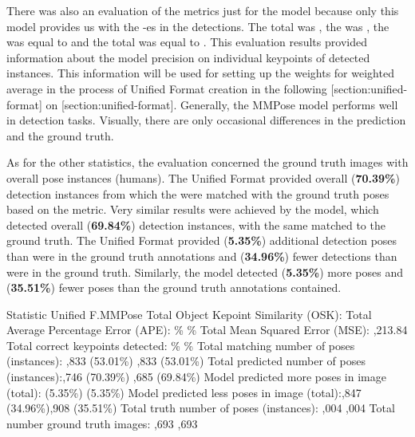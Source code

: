 
There was also an evaluation of the metrics just for the  model because only this model provides us with the \BBOX\--es in the detections. The total \pojem{\OKS} was , the \pojem{\APE} was , the \pojem{\MSE} was equal to  and the total  was equal to . This evaluation results provided information about the model precision on individual keypoints of detected instances. This information will be used for setting up the weights for weighted average in the process of Unified Format creation in the following [section:unified-format] on [section:unified-format]. Generally, the MMPose model performs well in detection tasks. Visually, there are only occasional differences in the prediction and the ground truth.

As for the other statistics, the evaluation concerned the  ground truth images with overall  pose instances (humans). The Unified Format provid\-ed overall  ({\bf 70.39\%}) detection instances from which the  were match\-ed with the ground truth poses based on the \pojem{\IoU} metric. Very similar results were achieved by the  model, which detected overall  ({\bf 69.84\%}) detection instances, with the same  matched to the ground truth. The Unified Format provided  ({\bf 5.35\%}) additional detection poses than were in the ground truth annotations and  ({\bf 34.96\%}) fewer detections than were in the ground truth. Similarly, the  model detected  ({\bf 5.35\%}) more poses and  ({\bf 35.51\%}) fewer poses than the ground truth annotations contained.

 \setupTABLE[r][1][style=bold]
 \setupTABLE[c][each][offset=3dd]
 \setupTABLE[frame=off]
 \setupTABLE[r][1][topframe=on,bottomframe=on]
 \setupTABLE[c][each][leftframe=on]
 \setupTABLE[c][1][leftframe=off]
 \setupTABLE[c][2,3][align=middle]
 \bTR\bTD Statistic \eTD\bTD Unified F.\eTD\bTD MMPose\eTD\eTR
 \bTR\bTD Total Object Kepoint Similarity (OSK): \eTD{} \eTD{} \eTD\eTR
 \bTR\bTD Total Average Percentage Error (APE): \eTD{}\% \eTD{}\% \eTD\eTR
 \bTR\bTD Total Mean Squared Error (MSE): \eTD{},213.84 \eTD{} \eTD\eTR
 \bTR\bTD Total correct keypoints detected: \eTD{}\% \eTD{}\% \eTD\eTR
 \bTR\bTD Total matching number of poses (instances): \eTD{},833 (53.01\%) \eTD{},833 (53.01\%) \eTD\eTR
 \bTR\bTD Total predicted number of poses (instances):\eTD{},746 (70.39\%) \eTD{},685 (69.84\%) \eTD\eTR
 \bTR\bTD Model predicted more poses in image (total):\eTD{} (5.35\%)\eTD{} (5.35\%) \eTD\eTR
 \bTR\bTD Model predicted less poses in image (total):\eTD{},847 (34.96\%)\eTD{},908 (35.51\%) \eTD\eTR
 \bTR\bTD Total truth number of poses (instances): \eTD{},004 \eTD{},004 \eTD\eTR
 \bTR\bTD Total number ground truth images: \eTD{},693 \eTD{},693 \eTD\eTR

